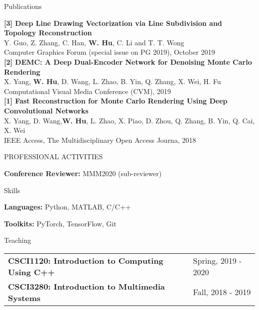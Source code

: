 \documentclass{resume} %
\begin{document}
\begin{rSection}{Publications}

{\bf [3] Deep Line Drawing Vectorization via Line Subdivision and Topology Reconstruction}
\\Y. Guo, Z. Zhang, C. Han, \textbf{W. Hu}, C. Li and T. T. Wong\\
Computer Graphics Forum (special issue on PG 2019), October 2019\\ 

{\bf [2] DEMC: A Deep Dual-Encoder Network for Denoising Monte Carlo Rendering}
\\X. Yang, \textbf{W. Hu}, D. Wang, L. Zhao, B. Yin, Q. Zhang, X. Wei, H. Fu\\
Computational Visual Media Conference (CVM), 2019\\ 

{\bf [1] Fast Reconstruction for Monte Carlo Rendering Using Deep Convolutional Networks}
\\X. Yang, D. Wang,\textbf{W. Hu}, L. Zhao, X. Piao, D. Zhou, Q. Zhang, B. Yin, Q. Cai, X. Wei\\
IEEE Access, The Multidisciplinary Open Access Journa, 2018\\

\end{rSection}


\begin{rSection}{PROFESSIONAL ACTIVITIES}
\item \textbf{Conference Reviewer:}
	\subitem MMM2020 (sub-reviewer)

\end{rSection}


\begin{rSection}{Skills}
\item \textbf{Languages:} Python, MATLAB, C/C++
\item \textbf{Toolkits:} PyTorch, TensorFlow, Git
\end{rSection}


\begin{rSection}{Teaching}

\begin{tabular}{ @{} >{\bfseries}l @{\hspace{6ex}} l }
CSCI1120: Introduction to Computing Using C++ \ & Spring, 2019 - 2020 \\
CSCI3280: Introduction to Multimedia Systems \ & Fall, 2018 - 2019 \\
\end{tabular}

\end{rSection}
\end{document}

